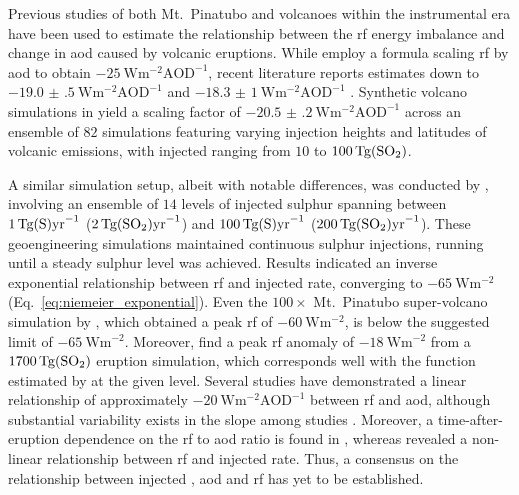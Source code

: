 \documentclass{ametsocV6.1}
\newcommand{\iso}[1][i]{{#1}njected \ce{SO2}}
\begin{document}
Previous studies of both Mt.\ Pinatubo \citep{mills2017,hansen2005} and volcanoes within
the instrumental era \citep{gregory2016} have been used to estimate the relationship
between the \gls{rf} energy imbalance and change in \gls{aod} caused by volcanic
eruptions. While \citet{myhre2013} employ a formula scaling \gls{rf} by \gls{aod} to
obtain \(\SI{-25}{\watt\metre^{-2}\mathrm{AOD}^{-1}}\), recent literature reports
estimates down to \(\SI{-19.0(5)}{\watt\metre^{-2}\mathrm{AOD}^{-1}}\)
\citep{gregory2016} and \(\SI{-18.3(10)}{\watt\metre^{-2}\mathrm{AOD}^{-1}}\)
\citep{mills2017}. Synthetic volcano simulations in \citet{marshall2020} yield a scaling
factor of \(\SI{-20.5(2)}{\watt\metre^{-2}\mathrm{AOD}^{-1}}\) across an ensemble of
\(82\) simulations featuring varying injection heights and latitudes of volcanic
emissions, with \iso{} ranging from \(10\) to \(\SI{100}{\tera\gram(\ce{SO2})}\).

A similar simulation setup, albeit with notable differences, was conducted by
\citet{niemeier2015}, involving an ensemble of \(14\) levels of injected sulphur
spanning between \(\SI{1}{\tera\gram(\ce{S})\mathrm{yr}^{-1}}\)
(\(\SI{2}{\tera\gram(\ce{SO2})\mathrm{yr}^{-1}}\)) and
\(\SI{100}{\tera\gram(\ce{S})\mathrm{yr}^{-1}}\)
(\(\SI{200}{\tera\gram(\ce{SO2})\mathrm{yr}^{-1}}\)). These geoengineering simulations
maintained continuous sulphur injections, running until a steady sulphur level was
achieved. Results indicated an inverse exponential relationship between \gls{rf} and
\iso{} rate, converging to \(\SI{-65}{\watt\metre^{-2}}\)
(Eq.~\ref{eq:niemeier_exponential}). Even the \(100\times\) Mt.\ Pinatubo super-volcano
simulation by \citet{jones2005}, which obtained a peak \gls{rf} of
\(\SI{-60}{\watt\metre^{-2}}\), is below the suggested limit of
\(\SI{-65}{\watt\metre^{-2}}\). Moreover, \citet{timmreck2010} find a peak \gls{rf}
anomaly of \(\SI{-18}{\watt\metre^{-2}}\) from a \(\SI{1700}{\tera\gram(\ce{SO2})}\)
eruption simulation, which corresponds well with the function estimated by
\citet{niemeier2015} at the given  level. Several studies have demonstrated a
linear relationship of approximately \(-\SI{20}{\watt\metre^{-2}\mathrm{AOD}^{-1}}\)
between \gls{rf} and \gls{aod}, although substantial variability exists in the slope
among studies \citep{mills2017,hansen2005,gregory2016,marshall2020,pitari2016b}.
Moreover, a time-after-eruption dependence on the \gls{rf} to \gls{aod} ratio is found
in \citet{marshall2020}, whereas \citet{niemeier2015} revealed a non-linear relationship
between \gls{rf} and \iso{} rate. Thus, a consensus on the relationship between \iso{},
\gls{aod} and \gls{rf} has yet to be established.
\end{document}

